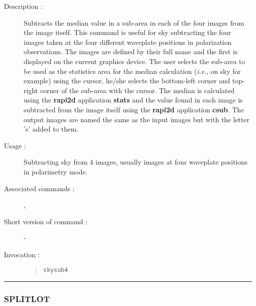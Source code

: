 \begin{description}

\item[Description :] Subtracts the median value in a sub-area in each
of the four images from the image itself.  This command is useful for
sky subtracting the four images taken at the four different waveplate
positions in polarization observations.  The images are defined by
their full name and the first is displayed on the current graphics
device.  The user selects the sub-area to be used as the statistics
area for the median calculation (\emph{i.e.}, on sky for example) using
the cursor, he/she selects the bottom-left corner and top-right corner
of the sub-area with the cursor.  The median is calculated using the
{\bf rapi2d} application {\bf stats} and the value found in each image is
subtracted from the image itself using the {\bf rapi2d} application
{\bf csub}.  The output images are named the same as the input images but
with the letter 's' added to them.

\item[Usage :] Subtracting sky from 4 images, usually images at four
waveplate positions in polarimetry mode.

\item[Associated commands :] {\tt {}},
{\tt {}}

\item[Short version of command :] -
\item[Invocation :]

\begin{quote}{\tt  skysub4 }\end{quote}

\end{description}

\hrule
\subsubsection*{\label{SPLITLOT}SPLITLOT}

